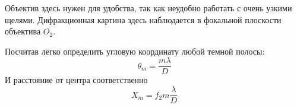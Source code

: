 \documentclass[a4paper, 12pt]{article}%
\begin{document}
Объектив здесь нужен для удобства, так как неудобно работать с очень узкими щелями. Дифракционная картина здесь наблюдается в фокальной плоскости объектива $O_2$.

Посчитав легко определить угловую координату любой темной полосы:
\begin{equation}
\theta_m = \frac{m \lambda}{D}
\end{equation}
И расстояние от центра соответственно
\begin{equation}
X_m = f_2m\frac{\lambda}{D}
\end{equation}

\end{document}

